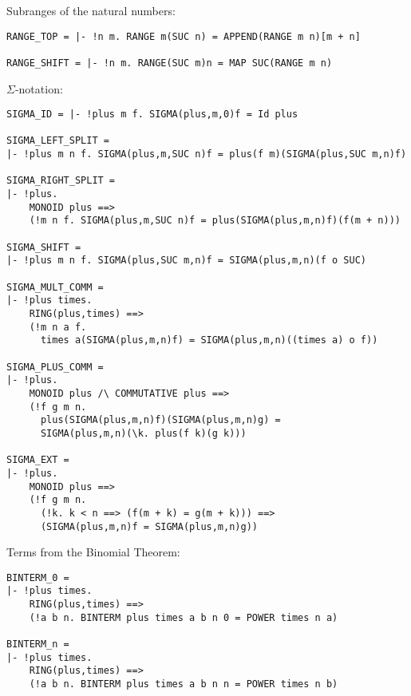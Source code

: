 Subranges of the natural numbers:
\begin{session}
\begin{verbatim}
RANGE_TOP = |- !n m. RANGE m(SUC n) = APPEND(RANGE m n)[m + n]

RANGE_SHIFT = |- !n m. RANGE(SUC m)n = MAP SUC(RANGE m n)
\end{verbatim}
\end{session}

\newpage
$\Sigma$-notation:
\begin{session}
\begin{verbatim}
SIGMA_ID = |- !plus m f. SIGMA(plus,m,0)f = Id plus

SIGMA_LEFT_SPLIT =
|- !plus m n f. SIGMA(plus,m,SUC n)f = plus(f m)(SIGMA(plus,SUC m,n)f)

SIGMA_RIGHT_SPLIT =
|- !plus.
    MONOID plus ==>
    (!m n f. SIGMA(plus,m,SUC n)f = plus(SIGMA(plus,m,n)f)(f(m + n)))

SIGMA_SHIFT =
|- !plus m n f. SIGMA(plus,SUC m,n)f = SIGMA(plus,m,n)(f o SUC)

SIGMA_MULT_COMM =
|- !plus times.
    RING(plus,times) ==>
    (!m n a f.
      times a(SIGMA(plus,m,n)f) = SIGMA(plus,m,n)((times a) o f))

SIGMA_PLUS_COMM =
|- !plus.
    MONOID plus /\ COMMUTATIVE plus ==>
    (!f g m n.
      plus(SIGMA(plus,m,n)f)(SIGMA(plus,m,n)g) =
      SIGMA(plus,m,n)(\k. plus(f k)(g k)))

SIGMA_EXT =
|- !plus.
    MONOID plus ==>
    (!f g m n.
      (!k. k < n ==> (f(m + k) = g(m + k))) ==>
      (SIGMA(plus,m,n)f = SIGMA(plus,m,n)g))
\end{verbatim}
\end{session}

Terms from the Binomial Theorem:
\begin{session}
\begin{verbatim}
BINTERM_0 =
|- !plus times.
    RING(plus,times) ==>
    (!a b n. BINTERM plus times a b n 0 = POWER times n a)

BINTERM_n =
|- !plus times.
    RING(plus,times) ==>
    (!a b n. BINTERM plus times a b n n = POWER times n b)
\end{verbatim}
\end{session}
